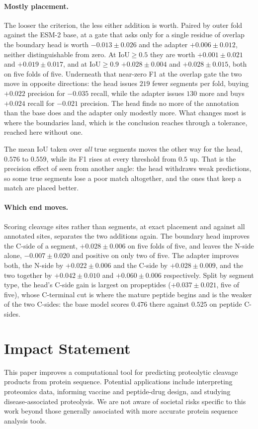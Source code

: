 \documentclass{article}
\begin{document}
\paragraph{Mostly placement.} The looser the criterion, the less either addition is worth.
Paired by outer fold against the ESM-2 base, at a gate that asks only for a single residue of
overlap the boundary head is worth $-0.013\pm0.026$ and the adapter $+0.006\pm0.012$, neither
distinguishable from zero. At $\mathrm{IoU}\ge0.5$ they are worth $+0.001\pm0.021$ and $+0.019\pm0.017$,
and at $\mathrm{IoU}\ge0.9$ $+0.028\pm0.004$ and $+0.028\pm0.015$, both on five folds of five. Underneath
that near-zero F1 at the overlap gate the two move in opposite directions: the head issues $219$
fewer segments per fold, buying $+0.022$ precision for $-0.035$ recall, while the adapter issues
$130$ more and buys $+0.024$ recall for $-0.021$ precision. The head finds no more of the annotation than the
base does and the adapter only modestly more. What changes most is where the boundaries land, which
is the conclusion  reaches through a tolerance, reached here without one.

The mean IoU taken over \emph{all} true segments moves the other way for the head, $0.576$ to
$0.559$, while its F1 rises at every threshold from $0.5$ up. That is the precision effect of
 seen from another angle: the head withdraws weak predictions, so some true
segments lose a poor match altogether, and the ones that keep a match are placed better.

\paragraph{Which end moves.} Scoring cleavage sites rather than segments, at exact placement and
against all annotated sites, separates the two additions again. The boundary head improves the
C-side of a segment, $+0.028\pm0.006$ on five folds of five, and leaves the N-side alone,
$-0.007\pm0.020$ and positive on only two of five. The adapter improves both, the N-side by $+0.022\pm0.006$ and the C-side by $+0.028\pm0.009$,
and the two together by $+0.042\pm0.010$ and $+0.060\pm0.006$ respectively. Split by segment
type, the head's C-side gain is largest on propeptides ($+0.037\pm0.021$, five of five), whose
C-terminal cut is where the mature peptide begins and is the weaker of the two C-sides: the base
model scores $0.476$ there against $0.525$ on peptide C-sides.


\FloatBarrier


\section*{Impact Statement}
This paper improves a computational tool for predicting proteolytic cleavage products from protein sequence. Potential applications include interpreting proteomics data, informing vaccine and peptide-drug design, and studying disease-associated proteolysis. We are not aware of societal risks specific to this work beyond those generally associated with more accurate protein sequence analysis tools.
\end{document}
